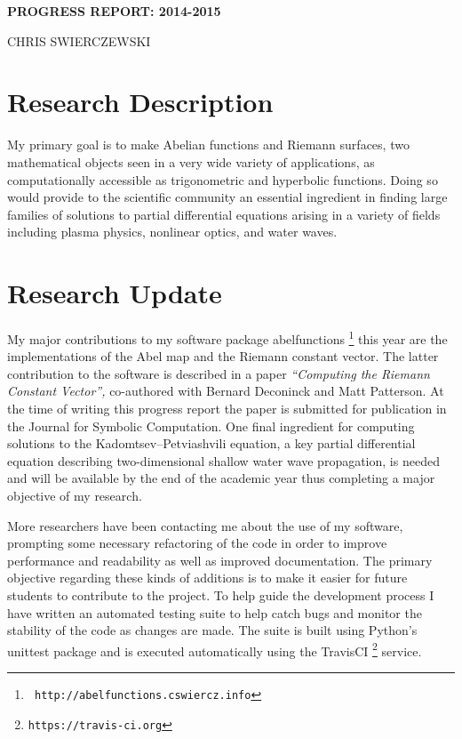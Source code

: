 \documentclass[12pt]{amsart}
\begin{document}
\begin{centering}
\large{\bf{PROGRESS REPORT: 2014-2015}}

\vspace{8pt}

CHRIS SWIERCZEWSKI



\vspace{24pt}

\end{centering}

\section*{Research Description}

My primary goal is to make Abelian functions and Riemann surfaces, two
mathematical objects seen in a very wide variety of applications, as
computationally accessible as trigonometric and hyperbolic functions. Doing so
would provide to the scientific community an essential ingredient in finding
large families of solutions to partial differential equations arising in a
variety of fields including plasma physics, nonlinear optics, and water waves.

\section*{Research Update}

My major contributions to my software package {\sc abelfunctions} \footnote{\tt
  http://abelfunctions.cswiercz.info} this year are the implementations of the
Abel map and the Riemann constant vector. The latter contribution to the
software is described in a paper {\it ``Computing the Riemann Constant
  Vector'',} co-authored with Bernard Deconinck and Matt Patterson. At the time
of writing this progress report the paper is submitted for publication in the
Journal for Symbolic Computation. One final ingredient for computing solutions
to the Kadomtsev--Petviashvili equation, a key partial differential equation
describing two-dimensional shallow water wave propagation, is needed and will
be available by the end of the academic year thus completing a major objective
of my research.

More researchers have been contacting me about the use of my software,
prompting some necessary refactoring of the code in order to improve
performance and readability as well as improved documentation. The primary
objective regarding these kinds of additions is to make it easier for future
students to contribute to the project. To help guide the development process I
have written an automated testing suite to help catch bugs and monitor the
stability of the code as changes are made. The suite is built using Python's
{\sc unittest} package and is executed automatically using the {\sc
  TravisCI} \footnote{\tt https://travis-ci.org} service.
\end{document}
